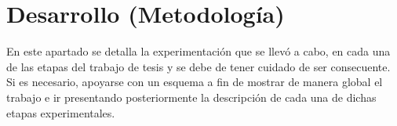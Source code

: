 \chapter{Desarrollo (Metodología)}

En este apartado se detalla la experimentación que se llevó a cabo, en cada una de las etapas del trabajo de tesis y se debe de tener cuidado de ser consecuente. Si es necesario, apoyarse con un esquema a fin de mostrar de manera global el trabajo e ir presentando posteriormente la descripción de cada una de dichas etapas experimentales.   



\lipsum[2-4]

\lipsum[2-4]

\lipsum[2-4]